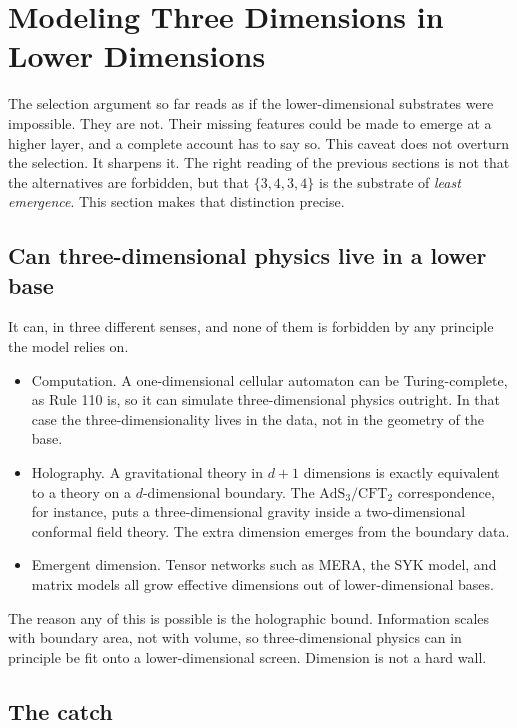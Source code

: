 \section{Modeling Three Dimensions in Lower Dimensions}

The selection argument so far reads as if the lower-dimensional substrates were impossible. They are not. Their
missing features could be made to emerge at a higher layer, and a complete account has to say so. This caveat does
not overturn the selection. It sharpens it. The right reading of the previous sections is not that the
alternatives are forbidden, but that $\{3,4,3,4\}$ is the substrate of \emph{least emergence}. This section makes
that distinction precise.

\subsection{Can three-dimensional physics live in a lower base}

It can, in three different senses, and none of them is forbidden by any principle the model relies on.

\begin{itemize}
  \item Computation. A one-dimensional cellular automaton can be Turing-complete, as Rule 110 is, so it can
  simulate three-dimensional physics outright. In that case the three-dimensionality lives in the data, not in the
  geometry of the base.
  \item Holography. A gravitational theory in $d+1$ dimensions is exactly equivalent to a theory on a
  $d$-dimensional boundary. The $\mathrm{AdS}_3/\mathrm{CFT}_2$ correspondence, for instance, puts a
  three-dimensional gravity inside a two-dimensional conformal field theory. The extra dimension emerges from the
  boundary data.
  \item Emergent dimension. Tensor networks such as MERA, the SYK model, and matrix models all grow effective
  dimensions out of lower-dimensional bases.
\end{itemize}

The reason any of this is possible is the holographic bound. Information scales with boundary area, not with
volume, so three-dimensional physics can in principle be fit onto a lower-dimensional screen. Dimension is not a
hard wall.

\subsection{The catch}

